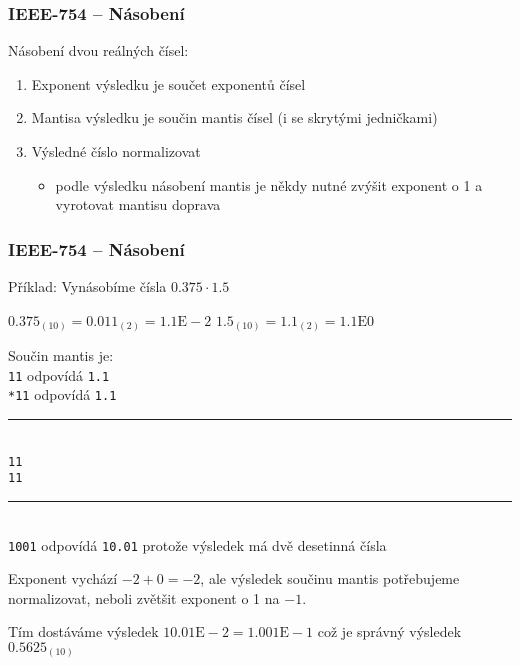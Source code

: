 \documentclass{beamer}
\begin{document}
\begin{frame}
\frametitle{IEEE-754 -- Násobení}

Násobení dvou reálných čísel:
\begin{enumerate}
\item Exponent výsledku je součet exponentů čísel
\item Mantisa výsledku je součin mantis čísel (i se skrytými jedničkami)
\item Výsledné číslo normalizovat
\begin{itemize}
\item podle výsledku násobení mantis je někdy nutné zvýšit exponent o 1 a vyrotovat mantisu doprava
\end{itemize}
\end{enumerate}
\end{frame}

\begin{frame}
\frametitle{IEEE-754 -- Násobení}

Příklad: Vynásobíme čísla $0.375 \cdot 1.5$

$0.375_{(10)} = 0.011_{(2)} = 1.1\text{E}-2$ \phantom{xxx} $1.5_{(10)} = 1.1_{(2)} = 1.1\text{E}0$

Součin mantis je:\\
\texttt{\phantom{xxx}11} odpovídá \texttt{1.1}\\
\texttt{\phantom{xx}*11} odpovídá \texttt{1.1}\vspace{-6pt}\\
\rule[0pt]{2cm}{0.4pt}\\
\texttt{\phantom{xxx}11}\\
\texttt{\phantom{xx}11}\vspace{-6pt}\\
\rule[0pt]{2cm}{0.4pt}\\
\texttt{\phantom{x}1001} odpovídá \texttt{10.01} protože výsledek má dvě desetinná čísla

Exponent vychází $-2+0=-2$, ale výsledek součinu mantis potřebujeme normalizovat, neboli zvětšit exponent o 1 na $-1$.

Tím dostáváme výsledek $10.01\text{E}-2 = 1.001\text{E}-1$ což je správný výsledek $0.5625_{(10)}$

\end{frame}
\end{document}
